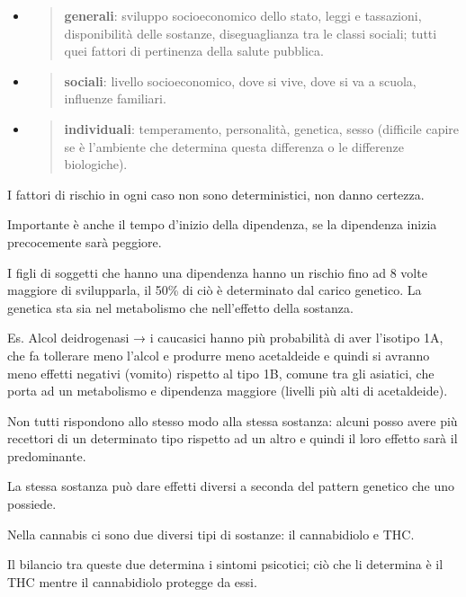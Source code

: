 \documentclass[]{article}
\begin{document}
\begin{itemize}
\item
  \begin{quote}
  \textbf{generali}: sviluppo socioeconomico dello stato, leggi e
  tassazioni, disponibilità delle sostanze, diseguaglianza tra le classi
  sociali; tutti quei fattori di pertinenza della salute pubblica.
  \end{quote}
\item
  \begin{quote}
  \textbf{sociali}: livello socioeconomico, dove si vive, dove si va a
  scuola, influenze familiari.
  \end{quote}
\item
  \begin{quote}
  \textbf{individuali}: temperamento, personalità, genetica, sesso
  (difficile capire se è l'ambiente che determina questa differenza o le
  differenze biologiche).
  \end{quote}
\end{itemize}

I fattori di rischio in ogni caso non sono deterministici, non danno
certezza.

Importante è anche il tempo d'inizio della dipendenza, se la dipendenza
inizia precocemente sarà peggiore.

I figli di soggetti che hanno una dipendenza hanno un rischio fino ad 8
volte maggiore di svilupparla, il 50\% di ciò è determinato dal carico
genetico. La genetica sta sia nel metabolismo che nell'effetto della
sostanza.

Es. Alcol deidrogenasi → i caucasici hanno più probabilità di aver
l'isotipo 1A, che fa tollerare meno l'alcol e produrre meno acetaldeide
e quindi si avranno meno effetti negativi (vomito) rispetto al tipo 1B,
comune tra gli asiatici, che porta ad un metabolismo e dipendenza
maggiore (livelli più alti di acetaldeide).

Non tutti rispondono allo stesso modo alla stessa sostanza: alcuni posso
avere più recettori di un determinato tipo rispetto ad un altro e quindi
il loro effetto sarà il predominante.

La stessa sostanza può dare effetti diversi a seconda del pattern
genetico che uno possiede.

Nella cannabis ci sono due diversi tipi di sostanze: il cannabidiolo e
THC.

Il bilancio tra queste due determina i sintomi psicotici; ciò che li
determina è il THC mentre il cannabidiolo protegge da essi.
\end{document}
